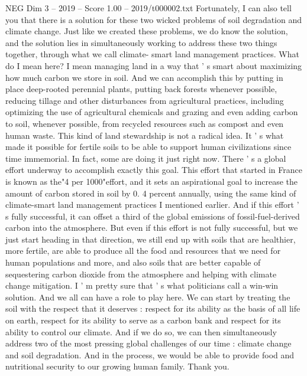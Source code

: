 \begin{textsample}{NEG Dim 3 – 2019 – Score 1.00 – 2019/t000002.txt}
Fortunately, I can also tell you that there is a solution for these two wicked problems of soil degradation and climate change.
Just like we created these problems, we do know the solution, and the solution lies in simultaneously working to address these two things together, through what we call climate- smart land management practices.
What do I mean here?
I mean managing land in a way that ' s smart about maximizing how much carbon we store in soil.
And we can accomplish this by putting in place deep-rooted perennial plants, putting back forests whenever possible, reducing tillage and other disturbances from agricultural practices, including optimizing the use of agricultural chemicals and grazing and even adding carbon to soil, whenever possible, from recycled resources such as compost and even human waste.
This kind of land stewardship is not a radical idea.
It ' s what made it possible for fertile soils to be able to support human civilizations since time immemorial.
In fact, some are doing it just right now.
There ' s a global effort underway to accomplish exactly this goal.
This effort that started in France is known as the"4 per 1000"effort, and it sets an aspirational goal to increase the amount of carbon stored in soil by 0. 4 percent annually, using the same kind of climate-smart land management practices I mentioned earlier.
And if this effort ' s fully successful, it can offset a third of the global emissions of fossil-fuel-derived carbon into the atmosphere.
But even if this effort is not fully successful, but we just start heading in that direction, we still end up with soils that are healthier, more fertile, are able to produce all the food and resources that we need for human populations and more, and also soils that are better capable of sequestering carbon dioxide from the atmosphere and helping with climate change mitigation.
I ' m pretty sure that ' s what politicians call a win-win solution.
And we all can have a role to play here.
We can start by treating the soil with the respect that it deserves : respect for its ability as the basis of all life on earth, respect for its ability to serve as a carbon bank and respect for its ability to control our climate.
And if we do so, we can then simultaneously address two of the most pressing global challenges of our time : climate change and soil degradation.
And in the process, we would be able to provide food and nutritional security to our growing human family.
Thank you.

\end{textsample}
